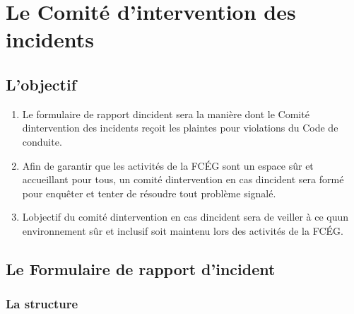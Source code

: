 \section{Le Comité d'intervention des incidents}
\label{le-comite-d-intervention-des-incidents}

\subsection{L'objectif}
\label{lobjectif-2}

\begin{enumerate}
 \item
  Le formulaire de rapport d\textquotesingle incident sera la manière dont le Comité d\textquotesingle intervention des incidents reçoit les plaintes pour violations du Code de conduite.
 \item
  Afin de garantir que les activités de la FCÉG sont un espace sûr et accueillant pour tous, un comité d\textquotesingle intervention en cas d\textquotesingle incident sera formé pour enquêter et tenter de résoudre tout problème signalé.
 \item
  L\textquotesingle objectif du comité d\textquotesingle intervention en cas d\textquotesingle incident sera de veiller à ce qu\textquotesingle un environnement sûr et inclusif soit maintenu lors des activités de la FCÉG.
\end{enumerate}

\subsection{Le Formulaire de rapport d'incident}
\label{le-formulaire-de-rapport-dincident}

\subsubsection{La structure}
\label{la-structure}

